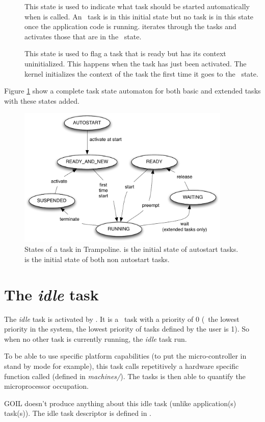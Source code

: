 \begin{description}
\item[\AUTOSTART] This state is used to indicate what task should be started automatically when  is called. An \AUTOSTART\ task is in this initial state but no task is in this state once the application code is running.  iterates through the tasks and activates those that are in the \AUTOSTART\ state.
\item[\READYANDNEW] This state is used to flag a task that is ready but has its context uninitialized. This happens when the task has just been activated. The kernel initializes the context of the task the first time it goes to the \RUNNING\ state.
\end{description}

Figure \ref{fig:states} show a complete task state automaton for both basic and extended tasks with these states added.

\begin{figure}[htbp] %
   \centering
   \includegraphics[width=4in]{pictures/states.pdf} 
   \caption{States of a task in Trampoline.  is the initial state of autostart tasks.  is the initial state of both non autostart tasks.}
   \label{fig:states}
\end{figure} 


\section{The {\em idle} task}

The {\em idle} task is activated by . It is a \BASIC\ task with a priority of 0 (\ie\ the lowest priority in the system, the lowest priority of tasks defined by the user is 1). So when no other task is currently running, the {\em idle} task run.

To be able to use specific platform capabilities (to put the micro-controller in stand by mode for example), this task calls repetitively a hardware specific function called  (defined in \textit{machines/}). The tasks is then able to quantify the microprocessor occupation.

GOIL doesn't produce anything about this idle task (unlike application(s) task(s)). The idle task descriptor is defined in .
